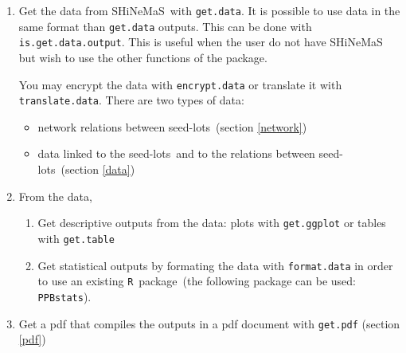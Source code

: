 \documentclass{article}\usepackage[]{graphicx}\usepackage[]{color}
\newcommand{\R}{\texttt{R}}
\renewcommand{\sl}{seed-lots}
\newcommand{\BD}{SHiNeMaS}
\newcommand{\listpackformatdata}{\texttt{PPBstats}}
\begin{document}
\begin{enumerate}
\item Get the data from \BD~with \texttt{get.data}. It is possible to use data in the same format than \texttt{get.data} outputs. This can be done with \texttt{is.get.data.output}. This is useful when the user do not have SHiNeMaS but wish to use the other functions of the package.

You may encrypt the data with \texttt{encrypt.data} or translate it with \texttt{translate.data}.
There are two types of data:
\begin{itemize}
\item network relations between \sl~(section \ref{network})
\item data linked to the \sl~and to the relations between \sl~(section \ref{data})
\end{itemize}

\item From the data,
	\begin{enumerate}
	\item Get descriptive outputs from the data: plots with \texttt{get.ggplot} or tables with \texttt{get.table}
	\item Get statistical outputs by formating the data with \texttt{format.data} in order to use an existing \R~package~(the following package can be used: \listpackformatdata).
	\end{enumerate}
\item Get a pdf that compiles the outputs in a pdf document with \texttt{get.pdf} (section \ref{pdf})
\end{enumerate}
\end{document}
